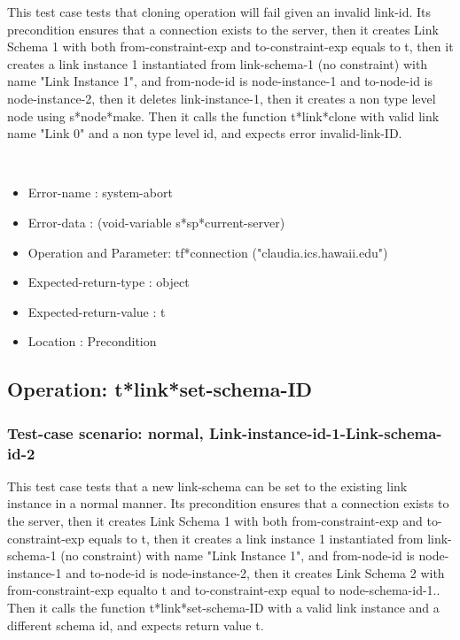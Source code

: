 This test case tests that cloning operation will fail given an invalid link-id.
Its precondition ensures that a connection exists to the server, then it creates Link Schema 1 with both from-constraint-exp and to-constraint-exp equals to t, then it creates a link instance 1 instantiated from  link-schema-1 (no constraint) with name "Link Instance 1", and from-node-id is node-instance-1 and to-node-id is node-instance-2, then it deletes link-instance-1, then it creates a non type level node using s*node*make.
Then it calls the function t*link*clone  with valid link name "Link 0" and a non type level id, and expects error invalid-link-ID.



\
\begin {itemize}
\item 	Error-name             : system-abort
\item Error-data             : (void-variable s*sp*current-server)
\item Operation and Parameter: tf*connection ("claudia.ics.hawaii.edu")
\item Expected-return-type   : object
\item Expected-return-value  : t
\item Location               : Precondition



\end {itemize}
\subsection {Operation: t*link*set-schema-ID}
\subsubsection {Test-case scenario: normal, Link-instance-id-1-Link-schema-id-2}


This test case tests that a new link-schema can be set to the existing link instance in a normal manner.
Its precondition ensures that a connection exists to the server, then it creates Link Schema 1 with both from-constraint-exp and to-constraint-exp equals to t, then it creates a link instance 1 instantiated from  link-schema-1 (no constraint) with name "Link Instance 1", and from-node-id is node-instance-1 and to-node-id is node-instance-2, then it creates Link Schema 2 with from-constraint-exp equalto t and to-constraint-exp equal to node-schema-id-1..
Then it calls the function t*link*set-schema-ID  with a valid link instance and a different schema id, and expects return value t.



